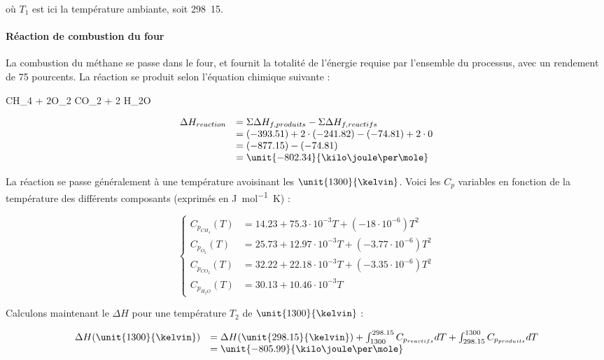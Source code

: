 où $T_1$ est ici la température ambiante, soit \unit{298.15}{\kelvin}.

\paragraph{Réaction de combustion du four}
La combustion du méthane se passe dans le four, et fournit la totalité de l'énergie 
requise par l'ensemble du processus, avec un rendement de 75 pourcents.
La réaction se produit selon l'équation chimique suivante :

\begin{chemmath}
	CH_4 + 2O_2 \Longrightarrow CO_2 + 2 H_2O
\end{chemmath}

$$
	\begin{array}{rl}
	\Delta H_{reaction}		&=  \Sigma \Delta H_{f,produits} - \Sigma \Delta H_{f,reactifs} \\
												&=  (-393.51) + 2\cdot(-241.82) - (-74.81) + 2\cdot0 \\
												&=  (-877.15) - (-74.81)\\
												&=  \unit{-802.34}{\kilo\joule\per\mole}
	\end{array}
$$

La réaction se passe généralement à une température avoisinant les $\unit{1300}{\kelvin}$.
Voici les $C_p$ variables en fonction de la température des différents composants\cite{hc-table} 
(exprimés en \unit{\joule\per\mole\kelvin}) :

$$
	\left\{
		\begin{array}{rl}
			C_{p_{CH_4}}(T) 	&= 14.23 + 75.3\cdot10^{-3}T + (-18\cdot10^{-6})T^2 \\
			C_{p_{O_2}}(T) 		&= 25.73 + 12.97\cdot10^{-3}T + (-3.77\cdot10^{-6})T^2 \\
			C_{p_{CO_2}}(T) 	&= 32.22 + 22.18\cdot10^{-3}T + (-3.35\cdot10^{-6})T^2 \\
			C_{p_{H_2O}}(T) 	&= 30.13 + 10.46\cdot10^{-3}T 
		\end{array}
	\right.
$$	

Calculons maintenant le $\Delta H$ pour une température $T_2$ de $\unit{1300}{\kelvin}$ :

$$
	\begin{array}{rl}
		 	\Delta H(\unit{1300}{\kelvin}) 	&=  \Delta H(\unit{298.15}{\kelvin}) + \int_{1300}^{298.15} C_{p_{reactifs}} dT + \int_{298.15}^{1300} C_{p_{produits}} dT \\
																			&=  \unit{-805.99}{\kilo\joule\per\mole}
	\end{array}
$$	

